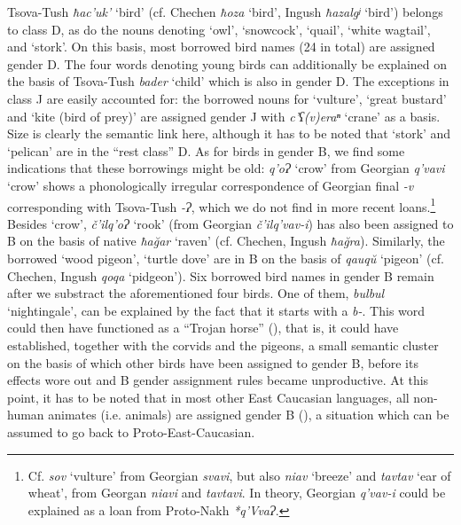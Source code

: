 Tsova-Tush \textit{ħac'uk'} `bird' (cf. Chechen \textit{ħoza} `bird’, Ingush \textit{ħazalgʲ} `bird’) belongs to class D, as do the nouns denoting `owl’, `snowcock’, `quail’, `white wagtail’, and `stork’. On this basis, most borrowed bird names (24 in total) are assigned gender D. The four words denoting young birds can additionally be explained on the basis of Tsova-Tush \textit{bader} `child’ which is also in gender D. The exceptions in class J are easily accounted for: the borrowed nouns for `vulture’, `great bustard’ and `kite (bird of prey)’ are assigned gender J with  \textit{c'ʕ(v)eraⁿ} `crane’ as a basis. Size is clearly the semantic link here, although it has to be noted that `stork’ and `pelican’ are in the ``rest class'' D. As for birds in gender B, we find some indications that these borrowings might be old: \textit{q'oɁ} `crow’ from Georgian \textit{q'vavi} `crow’ shows a phonologically irregular correspondence of Georgian final \textit{-v} corresponding with Tsova-Tush \textit{-Ɂ}, which we do not find in more recent loans.\footnote{Cf. \textit{sov} `vulture’ from Georgian \textit{svavi}, but also \textit{niav} `breeze’ and \textit{tavtav} `ear of wheat’, from Georgan \textit{niavi} and \textit{tavtavi}. In theory, Georgian \textit{q'vav-i} could be explained as a loan from Proto-Nakh \textit{*q'VvaɁ}.} Besides `crow’, \textit{č'ilq'oɁ} `rook’ (from Georgian \textit{č'ilq'vav-i}) has also been assigned to B on the basis of native \textit{ħa\u{g}ar} `raven’ (cf. Chechen, Ingush \textit{ħa\u{g}ra}). Similarly, the borrowed `wood pigeon’, `turtle dove’ are in B on the basis of \textit{qauq\u{u}} `pigeon’ (cf. Chechen, Ingush \textit{qoqa} ‘pidgeon’). Six borrowed bird names in gender B remain after we substract the aforementioned four birds. One of them, \textit{bulbul} `nightingale’, can be explained by the fact that it starts with a \textit{b-}. This word could then have functioned as a ``Trojan horse'' (\cite{corbett91}), that is, it could have established, together with the corvids and the pigeons, a small semantic cluster on the basis of which other birds have been assigned to gender B, before its effects wore out and B gender assignment rules became unproductive. At this point, it has to be noted that in most other East Caucasian languages, all non-human animates (i.e. animals) are assigned gender B (\cite[156]{vandenberg2005intro}), a situation which can be assumed to go back to Proto-East-Caucasian.

